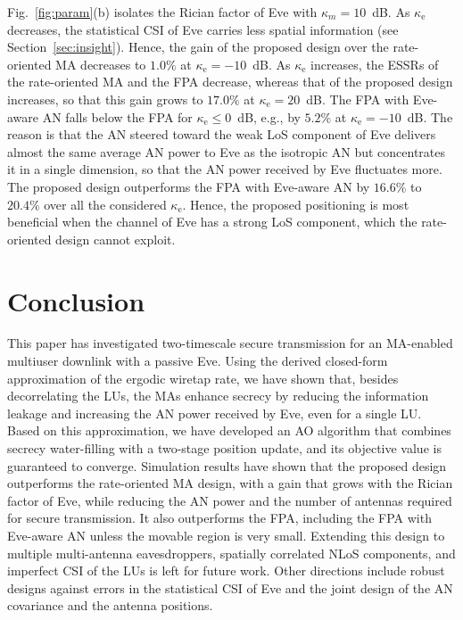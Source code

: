 \documentclass[journal]{IEEEtran}
\newcommand{\rev}[1]{{\color{red}#1}}
\newcommand{\rev}[1]{#1}
\begin{document}
Fig.~\ref{fig:param}(b) isolates the Rician factor of Eve with $\kappa_m=10$~dB. As $\kappa_{\mathrm e}$ decreases, the statistical CSI of Eve carries less spatial information (see Section~\ref{sec:insight}). Hence, the gain of the proposed design over the rate-oriented MA decreases to $1.0\%$ at $\kappa_{\mathrm e}=-10$~dB. As $\kappa_{\mathrm e}$ increases, the ESSRs of the rate-oriented MA and the FPA decrease, whereas that of the proposed design increases, so that this gain grows to $17.0\%$ at $\kappa_{\mathrm e}=20$~dB. The FPA with Eve-aware AN falls below the FPA for $\kappa_{\mathrm e}\le0$~dB, e.g., by $5.2\%$ at $\kappa_{\mathrm e}=-10$~dB. The reason is that the AN steered toward the weak LoS component of Eve delivers almost the same average AN power to Eve as the isotropic AN but concentrates it in a single dimension, so that the AN power received by Eve fluctuates more. The proposed design outperforms the FPA with Eve-aware AN by $16.6\%$ to $20.4\%$ over all the considered $\kappa_{\mathrm e}$. Hence, the \rev{proposed} positioning is most beneficial when the channel of Eve has a strong LoS component, which the rate-oriented design cannot exploit.

\section{Conclusion}\label{sec:conclusion}
This paper has investigated two-timescale secure transmission for an MA-enabled multiuser downlink with a passive Eve. Using the derived closed-form approximation of the ergodic wiretap rate, we have shown that, besides decorrelating the LUs, the MAs enhance secrecy by reducing the information leakage and increasing the AN \rev{power} received by Eve, even for a single LU. Based on this approximation, we have developed an AO algorithm that combines secrecy water-filling with a two-stage position update, and its objective value is guaranteed to converge. Simulation results have shown that the proposed design outperforms the rate-oriented MA design, with a gain that grows with the Rician factor of Eve, while reducing the AN power and the number of antennas required for secure transmission. It also outperforms the FPA, including the FPA with Eve-aware AN unless the movable region is very small. Extending this design to multiple multi-antenna eavesdroppers, spatially correlated NLoS components, and imperfect CSI of the LUs is left for future work. Other directions include robust designs against errors in the statistical CSI of Eve and the joint design of the AN covariance and the antenna positions.
\end{document}
